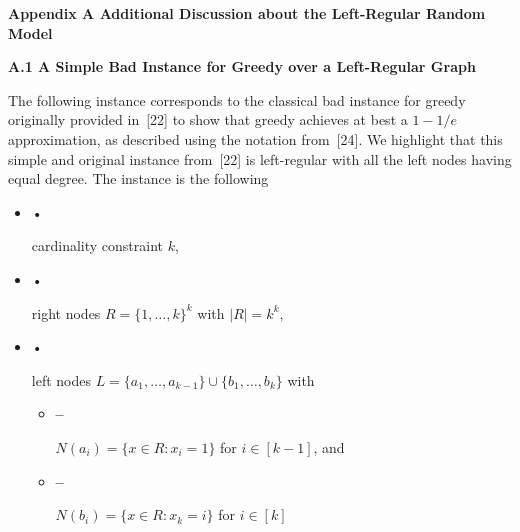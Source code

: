 \par\medskip\noindent\textbf{Appendix A Additional Discussion about the Left-Regular Random Model}\par




\par\medskip\noindent\textbf{A.1 A Simple Bad Instance for Greedy over a Left-Regular Graph}\par




The following instance corresponds to the classical bad instance for greedy originally provided in [22] to show that greedy achieves at best a $1-1/e$ approximation, as described using the notation from [24]. We highlight that this simple and original instance from [22] is left-regular with all the left nodes having equal degree. The instance is the following\par


\begin{itemize}


\item[] • 


cardinality constraint $k$,\par




\item[] • 


right nodes $R=\{1,\ldots,k\}^{k}$ with $|R|=k^{k}$,\par




\item[] • 


left nodes $L=\{a_{1},\ldots,a_{k-1}\}\cup\{b_{1},\ldots,b_{k}\}$ with\par


\begin{itemize}


\item[] \textbf{–} 


$N(a_{i})=\{x\in R:x_{i}=1\}$ for $i\in[k-1]$, and\par




\item[] \textbf{–} 


$N(b_{i})=\{x\in R:x_{k}=i\}$ for $i\in[k]$\par




\end{itemize}




\end{itemize}




